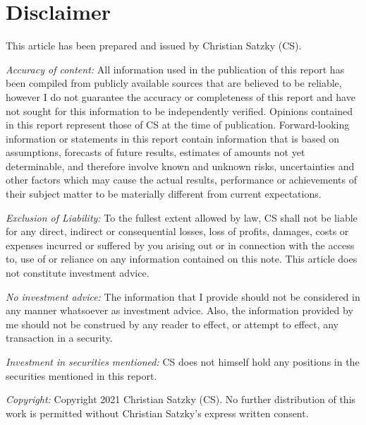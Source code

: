 \documentclass[
  12pt,
]{article}
\begin{document}
\newpage

\hypertarget{disclaimer}{%
\section{Disclaimer}\label{disclaimer}}

This article has been prepared and issued by Christian Satzky (CS).

\emph{Accuracy of content:} All information used in the publication of
this report has been compiled from publicly available sources that are
believed to be reliable, however I do not guarantee the accuracy or
completeness of this report and have not sought for this information to
be independently verified. Opinions contained in this report represent
those of CS at the time of publication. Forward-looking information or
statements in this report contain information that is based on
assumptions, forecasts of future results, estimates of amounts not yet
determinable, and therefore involve known and unknown risks,
uncertainties and other factors which may cause the actual results,
performance or achievements of their subject matter to be materially
different from current expectations.

\emph{Exclusion of Liability:} To the fullest extent allowed by law, CS
shall not be liable for any direct, indirect or consequential losses,
loss of profits, damages, costs or expenses incurred or suffered by you
arising out or in connection with the access to, use of or reliance on
any information contained on this note. This article does not constitute
investment advice.

\emph{No investment advice:} The information that I provide should not
be considered in any manner whatsoever as investment advice. Also, the
information provided by me should not be construed by any reader to
effect, or attempt to effect, any transaction in a security.

\emph{Investment in securities mentioned:} CS does not himself hold any
positions in the securities mentioned in this report.

\emph{Copyright:} Copyright 2021 Christian Satzky (CS). No further
distribution of this work is permitted without Christian Satzky's
express written consent.
\end{document}
